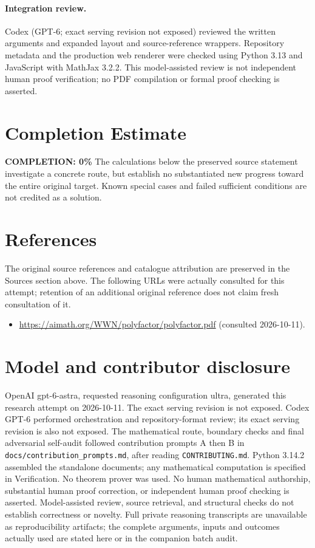 \documentclass[11pt]{article}
\begin{document}
\paragraph{Integration review.} Codex (GPT-6; exact serving revision not exposed) reviewed the written arguments and expanded layout and source-reference wrappers. Repository metadata and the production web renderer were checked using Python 3.13 and JavaScript with MathJax 3.2.2. This model-assisted review is not independent human proof verification; no PDF compilation or formal proof checking is asserted.

\section{Completion Estimate}
\noindent\textbf{COMPLETION: 0\%}
The calculations below the preserved source statement investigate a concrete route,
but establish no substantiated new progress toward the entire original target.
Known special cases and failed sufficient conditions are not credited as a solution.
\section{References}
The original source references and catalogue attribution are preserved in the
Sources section above. The following URLs were actually consulted for this attempt;
retention of an additional original reference does not claim fresh consultation of it.
\begin{itemize}
\item \url{https://aimath.org/WWN/polyfactor/polyfactor.pdf} (consulted 2026-10-11). 
\end{itemize}
\section{Model and contributor disclosure}
OpenAI gpt-6-astra, requested reasoning configuration ultra, generated this research
attempt on 2026-10-11. The exact serving revision is not exposed. Codex GPT-6
performed orchestration and repository-format review; its exact serving revision
is also not exposed. The mathematical route, boundary checks and final adversarial
self-audit followed contribution prompts A then B in
\texttt{docs/contribution\_prompts.md}, after reading \texttt{CONTRIBUTING.md}.
Python 3.14.2 assembled the standalone documents; any mathematical computation is
specified in Verification. No theorem prover was used. No human mathematical
authorship, substantial human proof correction, or independent human proof checking
is asserted. Model-assisted review, source retrieval, and structural checks do not
establish correctness or novelty. Full private reasoning transcripts are unavailable
as reproducibility artifacts; the complete arguments, inputs and outcomes actually
used are stated here or in the companion batch audit.
\end{document}

